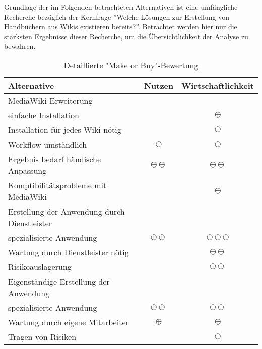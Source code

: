 \label{app:make_or_buy}

Grundlage der im Folgenden betrachteten Alternativen ist eine umfängliche Recherche bezüglich der Kernfrage
''Welche Lösungen zur Erstellung von Handbüchern aus Wikis existieren bereits?''.
Betrachtet werden hier nur die stärksten Ergebnisse dieser Recherche, um die Übersichtlichkeit der Analyse zu bewahren.

\begin{table}[H]
	\centering
	\begin{tabular}{lcc}

		\rowcolor{white!15}				
		\textbf{Alternative} & \textbf{Nutzen} & \textbf{Wirtschaftlichkeit} \\\hline		
		
		\rowcolor{MidnightBlue!15}
		MediaWiki Erweiterung 								& 					& 							\\\hline
		\hspace{1.5em} einfache Installation 				&					& $\oplus$  				\\
		\hspace{1.5em} Installation für jedes Wiki nötig 	&					& $\ominus$ 				\\
		\hspace{1.5em} Workflow umständlich 				& $\ominus$ 		& $\ominus$ 				\\
		\hspace{1.5em} Ergebnis bedarf händische Anpassung	& $\ominus\ominus$	& $\ominus\ominus$ 			\\
		\hspace{1.5em} Komptibilitätsprobleme mit MediaWiki	&  					& $\ominus$ 				\\
		
		\rowcolor{MidnightBlue!15}
		Erstellung der Anwendung durch Dienstleister 		& 					& 							\\\hline
		\hspace{1.5em} spezialisierte Anwendung 			& $\oplus\oplus$	& $\ominus\ominus\ominus$	\\
		\hspace{1.5em} Wartung durch Dienstleister nötig 	&					& $\ominus\ominus$ 			\\
		\hspace{1.5em} Risikoauslagerung 					&  					& $\oplus\oplus$ 			\\
		
		\rowcolor{MidnightBlue!15}
		Eigenständige Erstellung der Anwendung 				& 					& 							\\\hline
		\hspace{1.5em} spezialisierte Anwendung 			& $\oplus\oplus$	& $\ominus\ominus$ 			\\
		\hspace{1.5em} Wartung durch eigene Mitarbeiter  	& $\oplus$			& $\oplus$ 					\\
		\hspace{1.5em} Tragen von Risiken 					&  					& $\ominus$ 				\\									
			    
	\end{tabular}
	
	\caption{Detaillierte "Make or Buy"-Bewertung}
	\label{tab:make_or_buy_detail}
\end{table}		